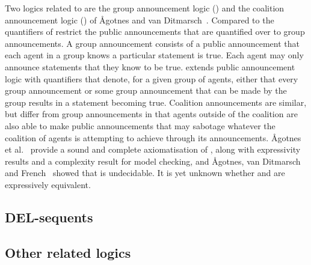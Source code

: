 Two logics related to \logicApal{} are the group announcement logic (\logicGal{}) and the coalition announcement logic (\logicCal{}) of {\AA}gotnes and van Ditmarsch~\cite{agotnes:2008,agotnes:2010}. 
Compared to \logicApal{} the quantifiers of \logicGal{} restrict the public announcements that are quantified over to group announcements.
A group announcement consists of a public announcement that each agent in a group knows a particular statement is true.
Each agent may only announce statements that they know to be true.
\logicGal{} extends public announcement logic with quantifiers that denote, for a given group of agents, either that every group announcement or some group announcement that can be made by the group results in a statement becoming true.
Coalition announcements are similar, but differ from group announcements in that agents outside of the coalition are also able to make public announcements that may sabotage whatever the coalition of agents is attempting to achieve through its announcements.
{\AA}gotnes et al.~\cite{agotnes:2010} provide a sound and complete axiomatisation of \logicGal{}, along with expressivity results and a complexity result for model checking, and {\AA}gotnes, van Ditmarsch and French~\cite{agotnes:2014} showed that \logicGal{} is undecidable.
It is yet unknown whether \logicGal{} and \logicCal{} are expressively equivalent.


\subsection{DEL-sequents}


\subsection{Other related logics}

